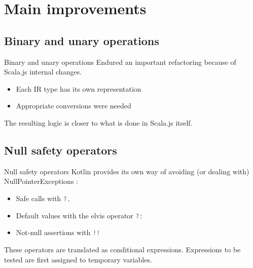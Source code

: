\documentclass[10pt]{beamer}
\newcommand{\inlinecode}[2]{\colorbox{minted-bg}{\lstinline[language=#1]$#2$}}
\newcommand{\ktinline}[1]{\inlinecode{kotlin}{#1}}
\begin{document}
\section{Main improvements}


\subsection{Binary and unary operations}


\begin{frame}[fragile]{Binary and unary operations}
  Endured an important refactoring because of Scala.js internal changes.
  
  \begin{itemize}
   \item Each IR type has its own representation
   \item Appropriate conversions were needed
  \end{itemize}
  
  The resulting logic is closer to what is done in Scala.js itself.

\end{frame}

\subsection{Null safety operators}


\begin{frame}[fragile]{Null safety operators}
 Kotlin provides its own way of avoiding (or dealing with) NullPointerExceptions :
 
 \begin{itemize}
  \item Safe calls with \ktinline{?.}
  \item Default values with the elvis operator \ktinline{?:}
  \item Not-null assertions with \ktinline{!!}
 \end{itemize}

 These operators are translated as conditional expressions. Expressions to be tested are first assigned to temporary variables.
 
\end{frame}
\end{document}
